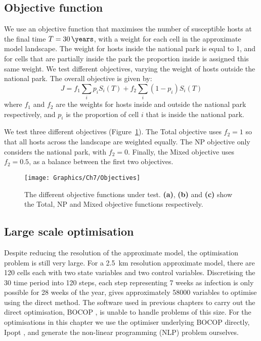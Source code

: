 \subsection{Objective function}

We use an objective function that maximises the number of susceptible hosts at the final time $T=\text{\SI{30}{\years}}$, with a weight for each cell in the approximate model landscape. The weight for hosts inside the national park is equal to 1, and for cells that are partially inside the park the proportion inside is assigned this same weight. We test different objectives, varying the weight of hosts outside the national park. The overall objective is given by:
\begin{equation}
    J = f_1\sum_ip_iS_i(T) + f_2\sum_i(1-p_i)S_i(T)
\end{equation}
where $f_1$ and $f_2$ are the weights for hosts inside and outside the national park respectively, and $p_i$ is the proportion of cell $i$ that is inside the national park.

We test three different objectives (Figure~\ref{fig:ch7:objectives}). The Total objective uses $f_2=1$ so that all hosts across the landscape are weighted equally. The NP objective only considers the national park, with $f_2=0$. Finally, the Mixed objective uses $f_2=0.5$, as a balance between the first two objectives.

\begin{figure}
    \begin{center}
        \texttt{[image: Graphics/Ch7/Objectives]}
        \caption[Objective functions under test]{The different objective functions under test. \textbf{(a)}, \textbf{(b)} and \textbf{(c)} show the Total, NP and Mixed objective functions respectively.\label{fig:ch7:objectives}}
    \end{center}
\end{figure}

\subsection{Large scale optimisation}

Despite reducing the resolution of the approximate model, the optimisation problem is still very large. For a \SI{2.5}{\km} resolution approximate model, there are 120 cells each with two state variables and two control variables. Discretising the \SI{30}{\year} time period into 120 steps, each step representing 7 weeks as infection is only possible for 28 weeks of the year, gives approximately \num{58000} variables to optimise using the direct method. The software used in previous chapters to carry out the direct optimisation, BOCOP \citep{bocop}, is unable to handle problems of this size. For the optimisations in this chapter we use the optimiser underlying BOCOP directly, Ipopt \citep{wachter_implementation_2006}, and generate the non-linear programming (NLP) problem ourselves.

